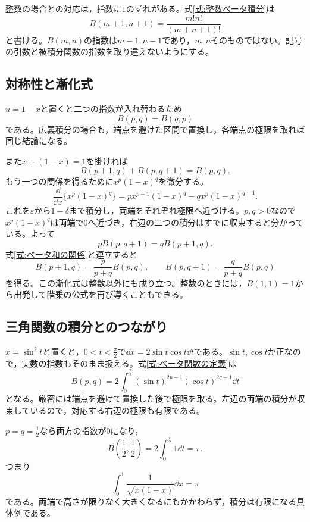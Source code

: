 整数の場合との対応は，指数に$1$のずれがある。式\eqref{式:整数ベータ積分}は
\[
 B(m+1,n+1)=\frac{m!n!}{(m+n+1)!}
\]
と書ける。$B(m,n)$の指数は$m-1,n-1$であり，$m,n$そのものではない。記号の引数と被積分関数の指数を取り違えないようにする。

\subsection{対称性と漸化式}

$u=1-x$と置くと二つの指数が入れ替わるため
\begin{equation}\label{式:ベータ対称性}
 B(p,q)=B(q,p)
\end{equation}
である。広義積分の場合も，端点を避けた区間で置換し，各端点の極限を取れば同じ結論になる。

また$x+(1-x)=1$を掛ければ
\begin{equation}\label{式:ベータ和の関係}
 B(p+1,q)+B(p,q+1)=B(p,q).
\end{equation}
もう一つの関係を得るために$x^p(1-x)^q$を微分する。
\[
 \frac{\dd}{\dd x}\{x^p(1-x)^q\}
 =p x^{p-1}(1-x)^q-qx^p(1-x)^{q-1}.
\]
これを$\varepsilon$から$1-\delta$まで積分し，両端をそれぞれ極限へ近づける。$p,q>0$なので$x^p(1-x)^q$は両端で$0$へ近づき，右辺の二つの積分はすでに収束すると分かっている。よって
\[
 pB(p,q+1)=qB(p+1,q).
\]
式\eqref{式:ベータ和の関係}と連立すると
\begin{equation}\label{式:ベータ漸化式}
 B(p+1,q)=\frac{p}{p+q}B(p,q),\qquad
 B(p,q+1)=\frac{q}{p+q}B(p,q)
\end{equation}
を得る。この漸化式は整数以外にも成り立つ。整数のときには，$B(1,1)=1$から出発して階乗の公式を再び導くこともできる。

\subsection{三角関数の積分とのつながり}

$x=\sin^2t$と置くと，$0<t<\frac{\pi}{2}$で$\dd x=2\sin t\cos t\dd t$である。$\sin t,\cos t$が正なので，実数の指数もそのまま扱える。式\eqref{式:ベータ関数の定義}は
\begin{equation}\label{式:ベータ三角表示}
 B(p,q)=2\int_0^{\frac{\pi}{2}}
 (\sin t)^{2p-1}(\cos t)^{2q-1}\dd t
\end{equation}
となる。厳密には端点を避けて置換した後で極限を取る。左辺の両端の積分が収束しているので，対応する右辺の極限も有限である。

$p=q=\frac12$なら両方の指数が$0$になり，
\[
 B\left(\frac12,\frac12\right)
 =2\int_0^{\frac{\pi}{2}}1\dd t=\pi.
\]
つまり
\[
 \int_0^1\frac1{\sqrt{x(1-x)}}\dd x=\pi
\]
である。両端で高さが限りなく大きくなるにもかかわらず，積分は有限になる具体例である。

